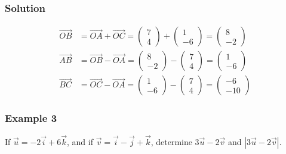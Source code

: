 \documentclass{article}
\begin{document}
\begin{minipage}{0.5\textwidth}
\subsubsection*{Solution}
\begin{align*}
\overrightarrow{OB} &= \overrightarrow{OA} + \overrightarrow{OC} = \begin{pmatrix} 7 \\ 4 \end{pmatrix} + \begin{pmatrix} 1 \\ -6 \end{pmatrix} = \begin{pmatrix} 8 \\ -2 \end{pmatrix} \\
\overrightarrow{AB} &= \overrightarrow{OB} - \overrightarrow{OA} = \begin{pmatrix} 8 \\ -2 \end{pmatrix} - \begin{pmatrix} 7 \\ 4 \end{pmatrix} = \begin{pmatrix} 1 \\ -6 \end{pmatrix} \\
\overrightarrow{BC} &= \overrightarrow{OC} - \overrightarrow{OA} = \begin{pmatrix} 1 \\ -6 \end{pmatrix} - \begin{pmatrix} 7 \\ 4 \end{pmatrix} = \begin{pmatrix} -6 \\ -10 \end{pmatrix}
\end{align*}
\end{minipage}

\subsubsection*{Example 3}
If $\vec{u}=-2\vec{i}+6\vec{k}$, and if $\vec{v}=\vec{i}-\vec{j}+\vec{k}$, determine $3\vec{u}-2\vec{v}$ and $|3\vec{u}-2\vec{v}|$.
\end{document}
